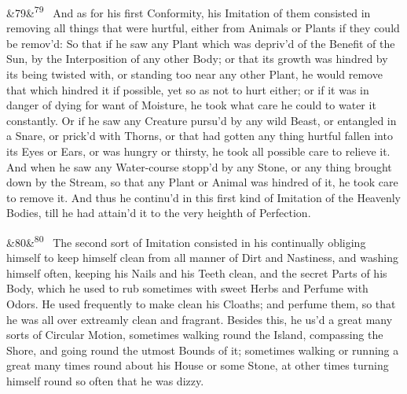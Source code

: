 \documentclass[12pt]{article}
\newcommand{\para}[1][]{\par\noindent\ifx&#1&\else\textsuperscript{\footnotesize #1}~\fi}
\begin{document}
\para[79] And as for his first Conformity, his Imitation of them consisted in removing all things that were hurtful, either from Animals or Plants if they could be remov'd: So that if he saw any Plant which was depriv'd of the Benefit of the Sun, by the Interposition of any other Body; or that its growth was hindred by its being twisted with, or standing too near any other Plant, he would remove that which hindred it if possible, yet so as not to hurt either; or if it was in danger of dying for want of Moisture, he took what care he could to water it constantly. Or if he saw any Creature pursu'd by any wild Beast, or entangled in a Snare, or prick'd with Thorns, or that had gotten any thing hurtful fallen into its Eyes or Ears, or was hungry or thirsty, he took all possible care to relieve it. And when he saw any Water-course stopp'd by any Stone, or any thing brought down by the Stream, so that any Plant or Animal was hindred of it, he took care to remove it. And thus he continu'd in this first kind of Imitation of the Heavenly Bodies, till he had attain'd it to the very heighth of Perfection.

\para[80] The second sort of Imitation consisted in his continually obliging himself to keep himself clean from all manner of Dirt and Nastiness, and washing himself often, keeping his Nails and his Teeth clean, and the secret Parts of his Body, which he used to rub sometimes with sweet Herbs and Perfume with Odors. He used frequently to make clean his Cloaths; and perfume them, so that he was all over extreamly clean and fragrant. Besides this, he us'd a great many sorts of Circular Motion, sometimes walking round the Island, compassing the Shore, and going round the utmost Bounds of it; sometimes walking or running a great many times round about his House or some Stone, at other times turning himself round so often that he was dizzy.
\end{document}
